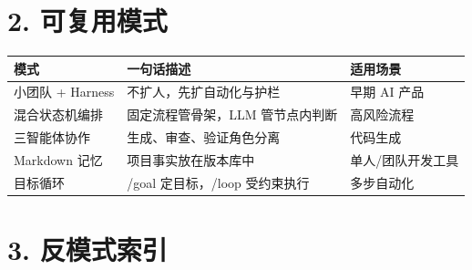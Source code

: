 \documentclass[9pt,a4paper,twocolumn]{ctexart}
\begin{document}
\section*{2. 可复用模式}

{\footnotesize
\begin{tabular}{|p{}|p{}|p{}|}
\hline
\textbf{模式} & \textbf{一句话描述} & \textbf{适用场景} \\
\hline
小团队 + Harness & 不扩人，先扩自动化与护栏 & 早期 AI 产品 \\
\hline
混合状态机编排 & 固定流程管骨架，LLM 管节点内判断 & 高风险流程 \\
\hline
三智能体协作 & 生成、审查、验证角色分离 & 代码生成 \\
\hline
Markdown 记忆 & 项目事实放在版本库中 & 单人/团队开发工具 \\
\hline
目标循环 & /goal 定目标，/loop 受约束执行 & 多步自动化 \\
\hline
\end{tabular}
}



\section*{3. 反模式索引}
\end{document}

